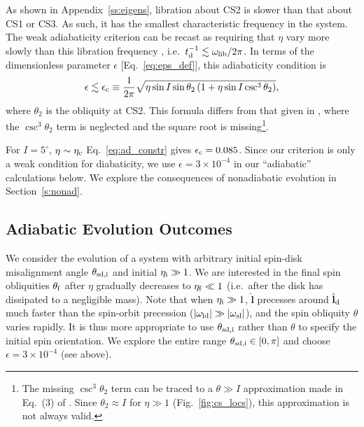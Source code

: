\documentclass[
        fleqn,
        usenatbib,
    ]{mnras}
\newcommand*{\abs}[1]{\left|#1\right|}
\newcommand*{\bm}[1]{\boldsymbol{\mathbf{#1}}}
\newcommand*{\uv}[1]{\hat{\bm{#1}}}
\newcommand*{\p}[1]{\left(#1\right)}
\begin{document}
As shown in Appendix~\ref{ss:eigens}, libration about CS2 is slower than that
about CS1 or CS3. As such, it has the smallest characteristic frequency in the
system. The weak adiabaticity criterion can be recast as requiring that $\eta$
vary more slowly than this libration frequency \citep[see][]{ward2004II}, i.e.\
$t_{\rm d}^{-1} \lesssim \omega_{\rm lib} / 2\pi$. In terms of the dimensionless
parameter $\epsilon$
[Eq.~\eqref{eq:eps_def}], this adiabaticity condition is
\begin{equation}
    \epsilon \lesssim \epsilon_{\rm c} \equiv
        \frac{1}{2\pi}\sqrt{\eta\sin I \sin \theta_2
            \p{1 + \eta \sin I \csc^3 \theta_2}},
            \label{eq:ad_constr}
\end{equation}
where $\theta_2$ is the obliquity at CS2. This formula differs from that given
in \citet{millholland_disk}, where the $\csc^3\!\theta_2$ term is neglected and
the square root is missing\footnote{The missing $\csc^3 \theta_2$ term can be
traced to a $\theta \gg I$ approximation made in Eq.~(3) of \citet{ward2004II}.
Since $\theta_2 \approx I$ for $\eta \gg 1$ (Fig.~\ref{fig:cs_locs}), this
approximation is not always valid.}.

For $I = 5^\circ$, $\eta \sim \eta_{\rm c}$ Eq.~\eqref{eq:ad_constr} gives
$\epsilon_{\rm c} = 0.085$. Since our criterion is only a weak condition for
diabaticity, we use $\epsilon = 3 \times 10^{-4}$ in our ``adiabatic''
calculations below. We explore the consequences of nonadiabatic evolution in
Section~\ref{s:nonad}.

\subsection{Adiabatic Evolution Outcomes}\label{ss:ad_ensemble}

We consider the evolution of a system with arbitrary initial spin-disk
misalignment angle $\theta_{\rm sd, i}$ and initial $\eta_{\rm i} \gg 1$. We are
interested in the final spin obliquities $\theta_{\rm f}$ after $\eta$ gradually
decreases to $\eta_{\rm f} \ll 1$ (i.e.\ after the disk has dissipated to a
negligible mass). Note that when $\eta_{\rm i} \gg 1$, $\uv{l}$ precesses
around $\uv{l}_{\rm d}$ much faster than the spin-orbit precession
($\abs{\omega_{\rm ld}} \gg \abs{\omega_{\rm sl}}$), and the spin obliquity
$\theta$ varies rapidly. It is thus more appropriate to use $\theta_{\rm sd, i}$
rather than $\theta$ to specify the initial spin orientation. We explore the
entire range $\theta_{\rm sd, i} \in [0, \pi]$ and choose $\epsilon = 3 \times
10^{-4}$ (see above).
\end{document}
